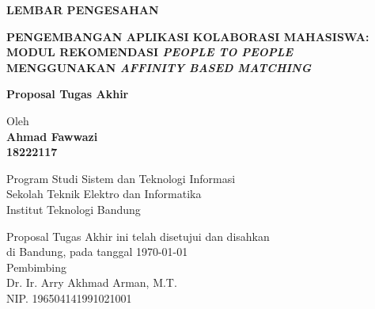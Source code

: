 \documentclass[12pt,a4paper,oneside]{book}
\begin{document}
\newpage
\thispagestyle{empty}
\begin{center}
  \textbf{\large LEMBAR PENGESAHAN}\\[1cm]
  \vspace*{1.5cm}
    
  {\large\bfseries  PENGEMBANGAN APLIKASI KOLABORASI MAHASISWA: MODUL REKOMENDASI \textit{PEOPLE TO PEOPLE} MENGGUNAKAN \textit{AFFINITY BASED MATCHING}}\\
     \vspace{2cm}

  {\Large \textbf{Proposal Tugas Akhir}}\\


  \vspace{1.5cm}
    
    
  {\large Oleh}\\[0.3cm]
    \textbf{
    {\large Ahmad Fawwazi}\\
    {\large 18222117}
  }\\
    
  \vspace{0.5cm}
 
  {\large Program Studi Sistem dan Teknologi Informasi}\\
  {\large Sekolah Teknik Elektro dan Informatika}\\
  {\large Institut Teknologi Bandung}\\

  \vspace{1.5cm}

  Proposal Tugas Akhir ini telah disetujui dan disahkan\\ 
  di Bandung, pada tanggal \today\\[1cm]

	Pembimbing  \\[3cm]
	Dr. Ir. Arry Akhmad Arman, M.T.   \\[0.2cm]
	NIP. 196504141991021001

\end{center}

\vspace{1cm}
\noindent

\end{document}
